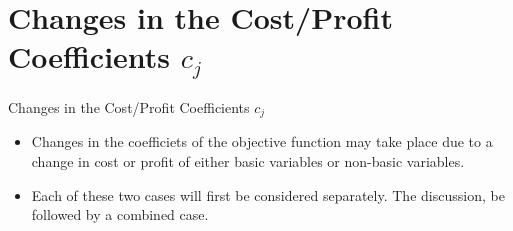
\section{Changes in the Cost/Profit Coefficients $c_j$}
\label{sec:changes-cost-profit}

\begin{frame}{Changes in the Cost/Profit Coefficients $c_j$}
  \begin{itemize}\justifying \parskip3mm
    \item Changes in the coefficiets of the objective function may take place due to a change in cost or profit of either \alert{basic variables or non-basic variables}.
    \item Each of these two cases will first be considered separately. The discussion, be followed by a combined case.
  \end{itemize}
\end{frame}

